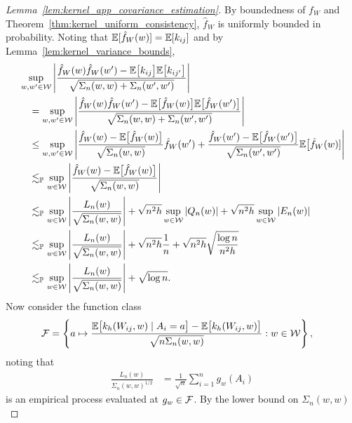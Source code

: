 \begin{proof}[Lemma~\ref{lem:kernel_app_covariance_estimation}]
  By boundedness of $f_W$ and
  Theorem~\ref{thm:kernel_uniform_consistency},
  $\hat f_W$ is uniformly bounded in probability.
  Noting that
  $\mathbb{E}[\hat f_W(w)] = \mathbb{E}[k_{i j}]$
  and by Lemma~\ref{lem:kernel_variance_bounds},
  \begin{align*}
    &\sup_{w,w' \in \mathcal{W}}
    \left|
    \frac{
      \hat f_W(w) \hat f_W(w')
    - \mathbb{E}\big[k_{i j}\big] \mathbb{E}\big[k_{i j'}\big]}
    {\sqrt{\Sigma_n(w,w) + \Sigma_n(w',w')}}
    \right| \\
    &\quad=
    \sup_{w,w' \in \mathcal{W}}
    \left|
    \frac{
      \hat f_W(w) \hat f_W(w')
    - \mathbb{E}\big[\hat f_W(w)\big] \mathbb{E}\big[\hat f_W(w')\big]}
    {\sqrt{\Sigma_n(w,w) + \Sigma_n(w',w')}}
    \right| \\
    &\quad\leq
    \sup_{w,w' \in \mathcal{W}}
    \left|
    \frac{\hat f_W(w) - \mathbb{E}\big[\hat f_W(w)\big]}
    {\sqrt{\Sigma_n(w,w)}}
    \hat f_W(w')
    + \frac{\hat f_W(w') - \mathbb{E}\big[\hat f_W(w')\big]}
    {\sqrt{\Sigma_n(w',w')}}
    \mathbb{E}\big[\hat f_W(w)]
    \right| \\
    &\quad\lesssim_{\mathbb{P}}
    \sup_{w \in \mathcal{W}}
    \left|
    \frac{\hat f_W(w) - \mathbb{E}\big[\hat f_W(w)\big]}
    {\sqrt{\Sigma_n(w,w)}}
    \right| \\
    &\quad\lesssim_{\mathbb{P}}
    \sup_{w \in \mathcal{W}}
    \left|
    \frac{L_n(w)}
    {\sqrt{\Sigma_n(w,w)}}
    \right|
    + \sqrt{n^2h} \sup_{w \in \mathcal{W}} \left| Q_n(w) \right|
    + \sqrt{n^2h} \sup_{w \in \mathcal{W}} \left| E_n(w) \right| \\
    &\quad\lesssim_{\mathbb{P}}
    \sup_{w \in \mathcal{W}}
    \left|
    \frac{L_n(w)}
    {\sqrt{\Sigma_n(w,w)}}
    \right|
    + \sqrt{n^2h} \frac{1}{n}
    + \sqrt{n^2h} \sqrt{\frac{\log n}{n^2h}} \\
    &\quad\lesssim_{\mathbb{P}}
    \sup_{w \in \mathcal{W}}
    \left|
    \frac{L_n(w)}
    {\sqrt{\Sigma_n(w,w)}}
    \right|
    + \sqrt{\log n}.
  \end{align*}
  Now consider the function class
  \begin{align*}
    \mathcal{F}
    &=
    \left\{
      a \mapsto
      \frac{
        \mathbb{E}\big[k_h(W_{i j},w) \mid A_i = a \big]
      - \mathbb{E}\big[k_h(W_{i j},w) \big]}
      {\sqrt{n \Sigma_n(w,w)}}:
      w \in \mathcal{W}
    \right\},
  \end{align*}
  noting that
  \begin{align*}
    \frac{L_n(w)}
    {\Sigma_n(w,w)^{1/2}}
    &=
    \frac{1}{\sqrt n}
    \sum_{i=1}^n
    g_w(A_i)
  \end{align*}
  is an empirical process evaluated at
  $g_w \in \mathcal{F}$.
  By the lower bound on $\Sigma_n(w,w)$

\end{proof}
